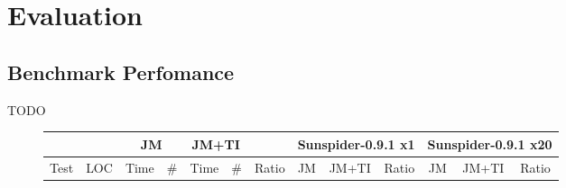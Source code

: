 
\section{Evaluation}

\subsection{Benchmark Perfomance}

TODO

\begin{figure*}
\begin{tabular}{|l|c|r@{.}lr|r@{.}lr|r@{.}l|r@{.}lr@{.}l|r@{.}l|r@{.}lr@{.}l|r@{.}l|}

\hline

\hline


     &     & \multicolumn{3}{|c|}{JM}
           & \multicolumn{3}{|c|}{JM+TI}
           & \multicolumn{2}{|c|}{}
           & \multicolumn{6}{|c|}{Sunspider-0.9.1 x1}
           & \multicolumn{6}{|c|}{Sunspider-0.9.1 x20} \\
\hline
Test & LOC & \multicolumn{2}{|c|}{Time} & \#
           & \multicolumn{2}{|c|}{Time} & \#
           & \multicolumn{2}{|c|}{Ratio}
           & \multicolumn{2}{|c|}{JM}
           & \multicolumn{2}{|c|}{JM+TI}
           & \multicolumn{2}{|c|}{Ratio}
           & \multicolumn{2}{|c|}{JM}
           & \multicolumn{2}{|c|}{JM+TI}
           & \multicolumn{2}{|c|}{Ratio} \\

\hline


\end{tabular}
\end{figure*}
